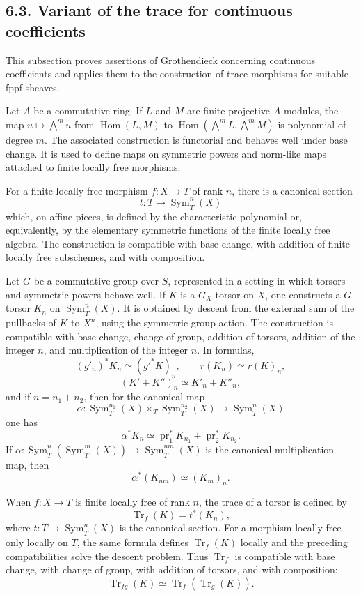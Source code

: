\documentclass[12pt]{article}
\DeclareMathOperator{\Hom}{Hom}
\DeclareMathOperator{\Sym}{Sym}
\DeclareMathOperator{\Tr}{Tr}
\begin{document}
\subsection*{6.3. Variant of the trace for continuous coefficients}

This subsection proves assertions of Grothendieck concerning continuous coefficients and applies them to the construction of trace morphisms for suitable fppf sheaves.

Let \(A\) be a commutative ring. If \(L\) and \(M\) are finite projective \(A\)-modules, the map \(u\mapsto\bigwedge^m u\) from \(\Hom(L,M)\) to \(\Hom(\bigwedge^mL,\bigwedge^mM)\) is polynomial of degree \(m\). The associated construction is functorial and behaves well under base change. It is used to define maps on symmetric powers and norm-like maps attached to finite locally free morphisms.

For a finite locally free morphism \(f:X\to T\) of rank \(n\), there is a canonical section
\[
t:T\longrightarrow \Sym_T^n(X)
\]
which, on affine pieces, is defined by the characteristic polynomial or, equivalently, by the elementary symmetric functions of the finite locally free algebra. The construction is compatible with base change, with addition of finite locally free subschemes, and with composition.

Let \(G\) be a commutative group over \(S\), represented in a setting in which torsors and symmetric powers behave well. If \(K\) is a \(G_X\)-torsor on \(X\), one constructs a \(G\)-torsor \(K_n\) on \(\Sym_T^n(X)\). It is obtained by descent from the external sum of the pullbacks of \(K\) to \(X^n\), using the symmetric group action. The construction is compatible with base change, change of group, addition of torsors, addition of the integer \(n\), and multiplication of the integer \(n\). In formulas,
\[
(g'_n)^*K_n\simeq (g'^*K)_n,
\qquad r(K_n)\simeq r(K)_n,
\]
\[
(K'+K'')_n\simeq K'_n+K''_n,
\]
and if \(n=n_1+n_2\), then for the canonical map
\[
\alpha:\Sym_T^{n_1}(X)\times_T\Sym_T^{n_2}(X)\to\Sym_T^n(X)
\]
one has
\[
\alpha^*K_n\simeq \operatorname{pr}_1^*K_{n_1}+\operatorname{pr}_2^*K_{n_2}.
\]
If \(\alpha:\Sym_T^n(\Sym_T^m(X))\to\Sym_T^{nm}(X)\) is the canonical multiplication map, then
\[
\alpha^*(K_{nm})\simeq (K_m)_n.
\]

When \(f:X\to T\) is finite locally free of rank \(n\), the trace of a torsor is defined by
\[
\Tr_f(K)=t^*(K_n),
\]
where \(t:T\to\Sym_T^n(X)\) is the canonical section. For a morphism locally free only locally on \(T\), the same formula defines \(\Tr_f(K)\) locally and the preceding compatibilities solve the descent problem. Thus \(\Tr_f\) is compatible with base change, with change of group, with addition of torsors, and with composition:
\[
\Tr_{fg}(K)\simeq \Tr_f(\Tr_g(K)).
\]
\end{document}
